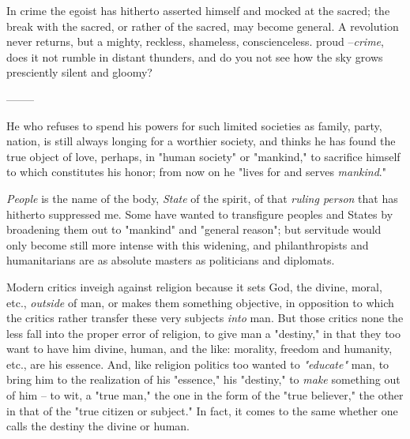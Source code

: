 In crime the egoist has hitherto asserted himself and mocked at the sacred; 
the break with the sacred, or rather of the sacred, may become general. A 
revolution never returns, but a mighty, reckless, shameless, conscienceless. 
proud --\textit{crime}, does it not rumble in distant thunders, and do you not 
see how the sky grows presciently silent and gloomy?

\begin{center}
--------\end{center}


He who refuses to spend his powers for such limited societies as family, 
party, nation, is still always longing for a worthier society, and thinks he 
has found the true object of love, perhaps, in "{}human society"{} or 
"{}mankind,"{} to sacrifice himself to which constitutes his honor; from now 
on he "{}lives for and serves \textit{mankind}."{}

\textit{People} is the name of the body, \textit{State} of the spirit, of that 
\textit{ruling person} that has hitherto suppressed me. Some have wanted to 
transfigure peoples and States by broadening them out to "{}mankind"{} and 
"{}general reason"{}; but servitude would only become still more intense with 
this widening, and philanthropists and humanitarians are as absolute masters 
as politicians and diplomats.

Modern critics inveigh against religion because it sets God, the divine, 
moral, etc., \textit{outside} of man, or makes them something objective, in 
opposition to which the critics rather transfer these very subjects 
\textit{into} man. But those critics none the less fall into the proper error 
of religion, to give man a "{}destiny,"{} in that they too want to have him 
divine, human, and the like: morality, freedom and humanity, etc., are his 
essence. And, like religion politics too wanted to \textit{"{}educate"{}} man, 
to bring him to the realization of his "{}essence,"{} his "{}destiny,"{} to 
\textit{make} something out of him -- to wit, a "{}true man,"{} the one in the 
form of the "{}true believer,"{} the other in that of the "{}true citizen or 
subject."{} In fact, it comes to the same whether one calls the destiny the 
divine or human.


